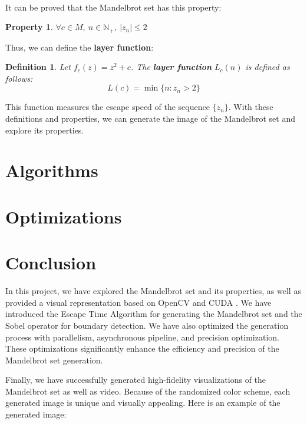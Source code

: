 \documentclass[11pt]{article}
\newtheorem{definition}{Definition}
\newtheorem{property}{Property}
\begin{document}
    It can be proved\textsuperscript{\cite{branner1989mandelbrot}} that the Mandelbrot set has this property:

    \begin{property}
        \label{prop:bounded}
        $\forall c \in M,\ n \in \mathbb{N}_+ ,\ |z_n| \leq 2$
    \end{property}

    Thus, we can define the \textbf{layer function}:

    \begin{definition}
        Let $f_c(z) = z^2 + c$.
        The \textbf{layer function} $L_c(n)$ is defined as follows:
        \begin{equation}
            L(c) = \min\{n : z_n > 2\}\label{eq:layer_function}
        \end{equation}
    \end{definition}

    This function measures the escape speed of the sequence $\{z_n\}$.
    With these definitions and properties, we can generate the image of the Mandelbrot set and explore its properties.


    \section{Algorithms}\label{sec:algorithms}
    

    \section{Optimizations}\label{sec:optimizations}
    


    \section{Conclusion}\label{sec:conclusion}

    In this project, we have explored the Mandelbrot set and its properties, as well as provided a visual representation
    based on OpenCV and CUDA .
    We have introduced the Escape Time Algorithm for generating the Mandelbrot set and the Sobel operator for boundary
    detection.
    We have also optimized the generation process with parallelism, asynchronous pipeline, and precision optimization.
    These optimizations significantly enhance the efficiency and precision of the Mandelbrot set generation.

    Finally, we have successfully generated high-fidelity visualizations of the Mandelbrot set as well as video.
    Because of the randomized color scheme, each generated image is unique and visually appealing.
    Here is an example of the generated image:
\end{document}
